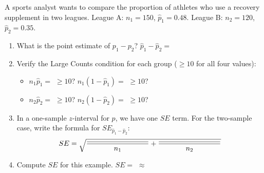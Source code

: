 \documentclass[10pt]{article}
\begin{document}
\namedateperiod

\vspace{0.15in}

A sports analyst wants to compare the proportion of athletes who use a recovery supplement
in two leagues. League A: $n_1 = 150$, $\hat p_1 = 0.48$. League B: $n_2 = 120$, $\hat p_2 = 0.35$.

\begin{enumerate}
  \item What is the point estimate of $p_1 - p_2$?
        $\hat p_1 - \hat p_2 = $ \blank{3cm}

  \item Verify the Large Counts condition for each group ($\ge 10$ for all four values):
        \begin{itemize}
          \item $n_1 \hat p_1 = $ \blank{3cm} $\ge 10$? \blank{1cm} \quad $n_1(1-\hat p_1) = $ \blank{3cm} $\ge 10$? \blank{1cm}
          \item $n_2 \hat p_2 = $ \blank{3cm} $\ge 10$? \blank{1cm} \quad $n_2(1-\hat p_2) = $ \blank{3cm} $\ge 10$? \blank{1cm}
        \end{itemize}

  \item In a one-sample $z$-interval for $p$, we have one $SE$ term. For the two-sample case,
        write the formula for $SE_{\hat p_1 - \hat p_2}$:
        \[SE = \sqrt{\dfrac{\blank{3cm}}{n_1} + \dfrac{\blank{3cm}}{n_2}}\]

  \item Compute $SE$ for this example.
        $SE = $ \blank{6cm} $\approx$ \blank{2cm}
\end{enumerate}
\end{document}
